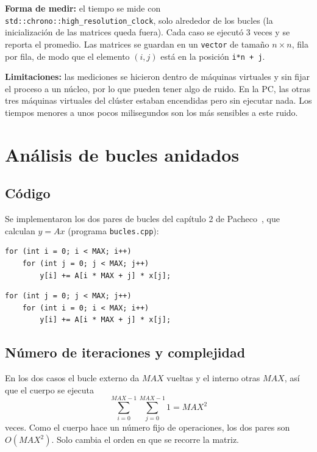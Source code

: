 \documentclass[11pt]{article}
\begin{document}
\textbf{Forma de medir:} el tiempo se mide con
\texttt{std::chrono::high\_resolution\_clock}, solo alrededor de los bucles
(la inicialización de las matrices queda fuera). Cada caso se ejecutó 3
veces y se reporta el promedio. Las matrices se guardan en un
\texttt{vector} de tamaño $n \times n$, fila por fila, de modo que el
elemento $(i,j)$ está en la posición \texttt{i*n + j}.

\textbf{Limitaciones:} las mediciones se hicieron dentro de máquinas
virtuales y sin fijar el proceso a un núcleo, por lo que pueden tener algo
de ruido. En la PC, las otras tres máquinas virtuales del clúster estaban
encendidas pero sin ejecutar nada. Los tiempos menores a unos pocos
milisegundos son los más sensibles a este ruido.

\section{Análisis de bucles anidados}

\subsection{Código}

Se implementaron los dos pares de bucles del capítulo 2 de
Pacheco~\cite{pacheco}, que calculan $y = Ax$ (programa
\texttt{bucles.cpp}):

\begin{lstlisting}[caption={Primer par: recorre $A$ por filas.}]
for (int i = 0; i < MAX; i++)
    for (int j = 0; j < MAX; j++)
        y[i] += A[i * MAX + j] * x[j];
\end{lstlisting}

\begin{lstlisting}[caption={Segundo par: recorre $A$ por columnas.}]
for (int j = 0; j < MAX; j++)
    for (int i = 0; i < MAX; i++)
        y[i] += A[i * MAX + j] * x[j];
\end{lstlisting}

\subsection{Número de iteraciones y complejidad}

En los dos casos el bucle externo da $\mathit{MAX}$ vueltas y el interno otras
$\mathit{MAX}$, así que el cuerpo se ejecuta
\[
\sum_{i=0}^{\mathit{MAX}-1} \sum_{j=0}^{\mathit{MAX}-1} 1 = \mathit{MAX}^2
\]
veces. Como el cuerpo hace un número fijo de operaciones, los dos pares son
$O(\mathit{MAX}^2)$. Solo cambia el orden en que se recorre la matriz.
\end{document}
